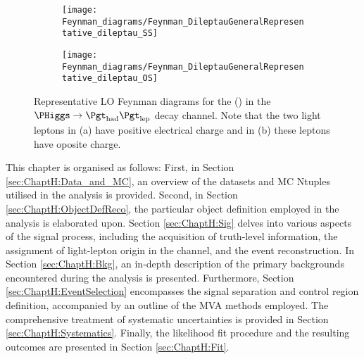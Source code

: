 \begin{figure}[htbp!]
  \centering  
  \begin{subfigure}[b]{0.45\textwidth}
    \centering
    \texttt{[image: Feynman\_diagrams/Feynman\_DileptauGeneralRepresentative\_dileptau\_SS]}
    \caption{\dilepSStau}
    \label{fig:tHq:intro:diltauFeynmanDiagram:SS}
  \end{subfigure}
  \hfill
  \begin{subfigure}[b]{0.45\textwidth}
    \centering
    \texttt{[image: Feynman\_diagrams/Feynman\_DileptauGeneralRepresentative\_dileptau\_OS]}
    \caption{\dilepOStau}
    \label{fig:tHq:intro:diltauFeynmanDiagram:OS}
  \end{subfigure}
  \caption{Representative LO Feynman diagrams for the \tHq (\dileptau) in the $\PHiggs \rightarrow \tauhad \taulep$ decay channel.
  Note that the two light leptons in (a) have positive electrical charge and in (b) these leptons have oposite charge.}
  \label{fig:tHq:intro:diltauFeynmanDiagram}
\end{figure}

This chapter is organised as follows: First, in Section \ref{sec:ChaptH:Data_and_MC}, an overview of 
the datasets and MC Ntuples utilised in the analysis is provided. Second, in Section \ref{sec:ChaptH:ObjectDefReco}, 
the particular object definition employed in the analysis is elaborated upon. Section \ref{sec:ChaptH:Sig} delves into various aspects 
of the signal process, including the acquisition of truth-level information, the assignment of light-lepton origin in the 
\dilepSStau channel, and the event reconstruction. In Section \ref{sec:ChaptH:Bkg}, an in-depth description 
of the primary backgrounds encountered during the analysis is presented.
Furthermore, Section \ref{sec:ChaptH:EventSelection} encompasses the signal separation and control region definition, 
accompanied by an outline of the MVA methods employed.
The comprehensive treatment of systematic uncertainties is provided in Section \ref{sec:ChaptH:Systematics}.
Finally, the likelihood fit procedure and the resulting outcomes are presented in Section \ref{sec:ChaptH:Fit}.




